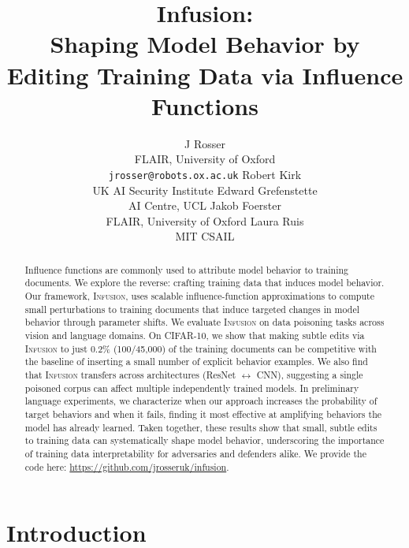 \documentclass{article} %
\title{Infusion:\\Shaping Model Behavior by Editing Training Data via Influence Functions}
\author{
\And
J Rosser \\
FLAIR, University of Oxford \\
\texttt{jrosser@robots.ox.ac.uk}
\And
Robert Kirk \\
UK AI Security Institute
\And
\AND
Edward Grefenstette \\
AI Centre, UCL
\And
\And
\And
\And
\And
Jakob Foerster \\
FLAIR, University of Oxford
\And
\And
\And
\And
\And
Laura Ruis \\
MIT CSAIL
}
\begin{document}
\maketitle

\begin{abstract}

Influence functions are commonly used to attribute model behavior to training documents. We explore the reverse: crafting training data that induces model behavior. Our framework, \textsc{Infusion}, uses scalable influence-function approximations to compute small perturbations to training documents that induce targeted changes in model behavior through parameter shifts. We evaluate \textsc{Infusion} on data poisoning tasks across vision and language domains. On CIFAR-10, we show that making subtle edits via \textsc{Infusion} to just 0.2\% (100/45,000) of the training documents can be competitive with the baseline of inserting a small number of explicit behavior examples. We also find that \textsc{Infusion} transfers across architectures (ResNet $\leftrightarrow$ CNN), suggesting a single poisoned corpus can affect multiple independently trained models. In preliminary language experiments, we characterize when our approach increases the probability of target behaviors and when it fails, finding it most effective at amplifying behaviors the model has already learned. Taken together, these results show that small, subtle edits to training data can systematically shape model behavior, underscoring the importance of training data interpretability for adversaries and defenders alike. We provide the code here: \url{https://github.com/jrosseruk/infusion}.
\end{abstract}

\section{Introduction}
\end{document}
